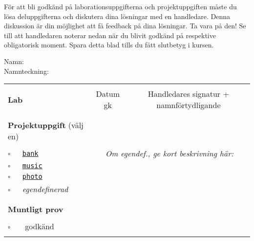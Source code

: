 \vspace{1em}\noindent
För att bli godkänd på laborationsuppgifterna och projektuppgiften måste du lösa deluppgifterna och diskutera dina lösningar med en handledare. Denna diskussion är din möjlighet att få feedback på dina lösningar. Ta vara på den!
Se till att handledaren noterar nedan när du blivit godkänd på respektive obligatorisk moment. Spara detta blad tills du fått slutbetyg i kursen.


\vspace{2.2em}\noindent Namn: \dotfill\\

\vspace{1em}\noindent Namnteckning: \dotfill\\

\newcommand{\LabRow}[1]{\\[-1.1em] \hyperref[section:lab:#1]{\texttt{#1}} & \dotfill &  \dotfill  \\[0.7em]}  %

\begin{table}[h]
\vspace{1em}
\begin{tabular}{lcc}
\hline%
\\
{\sffamily\bfseries\small Lab} & {\sffamily\small Datum gk} &	
{\sffamily\small Handledares signatur + namnförtydligande}\\ %
\\[-0.5em]

\\ 
{\sffamily\small {\bfseries Projektuppgift} (välj en)	} & \dotfill &  \dotfill  \\
\\
{\Large$\square$}\texttt{~~~\hyperref[section:proj:bank]{bank}} &
\multicolumn{2}{c}{\textit{Om egendef., ge kort beskrivning här:}}  \\[0.6em] %
{\Large$\square$}\texttt{~~~\hyperref[section:proj:music]{music}} \\[0.6em] %
{\Large$\square$}\texttt{~~~\hyperref[section:proj:photo]{photo}}  \\[0.6em] %
{\Large$\square$}\texttt{~~~}\textit{egendefinerad}  \\
\\
\\
{\sffamily\small {\bfseries Muntligt prov}} &  & \\
\\
{\Large$\square$}\texttt{~~~} godkänd & \dotfill &  \dotfill \\
\\\hline%
\end{tabular}
\end{table}
